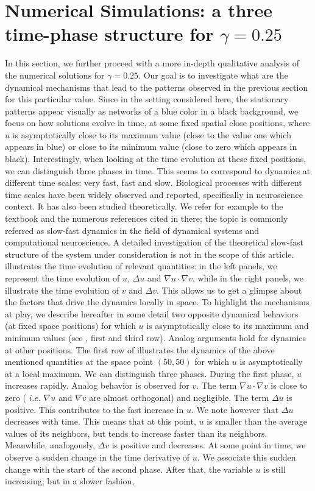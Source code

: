\documentclass[final,1p,times]{elsarticle}
\begin{document}
\section{Numerical Simulations: a three time-phase structure for $\gamma=0.25$}
\label{sec:NS3timephase}
In this section, we further proceed with a more in-depth qualitative analysis of the numerical solutions for $\gamma=0.25$. Our goal is to investigate what are the dynamical mechanisms that lead to the patterns observed in the previous section for this particular value. Since in the setting considered here, the stationary patterns appear visually as networks of a blue color in a black background, we focus on how solutions evolve in time, at some fixed spatial close positions, where $u$ is asymptotically close to its maximum value (close to the value one which appears in blue)  or close to its minimum value (close to zero which appears in black). Interestingly, when looking at the time evolution at these fixed positions, we can distinguish three phases in time. This seems to correspond to dynamics at different time scales: very fast, fast and slow. Biological processes with different time scales have been widely observed and reported, specifically in neuroscience context. It has also been studied theoretically. We refer for example to the textbook \cite{BookKuehn} and the numerous references cited in there; the topic is commonly referred as slow-fast dynamics in the field of dynamical systems and computational neuroscience. A detailed investigation of the theoretical slow-fast structure of the system under consideration is not in the scope of this article.  illustrates the time evolution of relevant quantities: in the left panels, we represent the time evolution of $u$, $\Delta u$ and $\nabla u \cdot \nabla v$, while in the right panels, we illustrate the time evolution of $v$ and $\Delta v$. This allows us to get a glimpse about the factors that drive the dynamics locally in space. To highlight the mechanisms at play, we describe hereafter in some detail two opposite dynamical behaviors (at fixed space positions) for which $u$ is asymptotically close to its maximum and minimum values (see , first and third row). Analog arguments hold for dynamics at other positions. The first row of  illustrates the dynamics of the above mentioned quantities at the space point $(50,50)$ for which $u$ is asymptotically at a local maximum. We can distinguish three phases. During the first phase, $u$ increases rapidly. Analog behavior is observed for $v$. The term $\nabla u \cdot \nabla v$ is close to zero ( $i.e.$ $\nabla u$ and $\nabla v$ are almost orthogonal) and negligible. The term $\Delta  u$ is positive. This contributes to the fast increase in $u$. We note however that $\Delta  u$ decreases with time. This means that at this point, $u$ is smaller than the average values of its neighbors, but tends to increase faster than its neighbors. Meanwhile, analogously, $\Delta v$ is positive and decreases. At some point in time, we observe a sudden change in the time derivative of $u$. We associate this sudden change with the start of the second phase. After that, the variable $u$ is still increasing, but in a slower fashion, 
\end{document}
